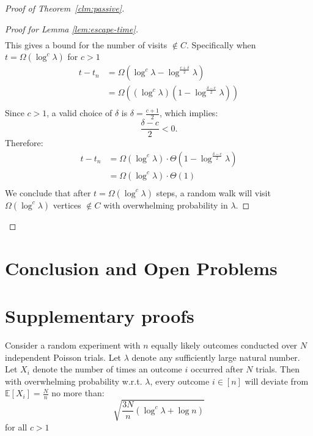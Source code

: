 \begin{proof} [Proof of Theorem~\ref{clm:passive}]
\begin{proof}[Proof for Lemma \ref{lem:escape-time}]
\begin{align*}
\end{align*}
This gives a bound for the number of visits $\not\in C$. Specifically when $t = \Omega(\log^c \lambda)$ for $c > 1$
\begin{align*}
    t - t_n &= \Omega(\log^c \lambda - \log^{\frac{c + \delta}{2}}\lambda)\\
    &= \Omega((\log^c \lambda)(1 - \log^{\frac{\delta - c}{2}}\lambda))\\
\end{align*}
Since $c > 1$, a valid choice of $\delta$ is $\delta = \frac{c + 1}{2}$, which implies:
$$
\frac{\delta - c}{2} < 0.
$$
Therefore:
\begin{align*}
    t - t_n &= \Omega(\log^c \lambda) \cdot \Theta(1 - \log^{\frac{\delta - c}{2}}\lambda)\\
    &= \Omega(\log^c \lambda) \cdot \Theta(1)\\
\end{align*}
We conclude that after $t = \Omega(\log^c \lambda)$ steps, a random walk will visit $\Omega(\log^c \lambda)$ vertices $\not\in C$ with overwhelming probability in $\lambda$.
\end{proof}

    
\end{proof}


\section{Conclusion and Open Problems}


\clearpage
%
%

 

\appendix 

\clearpage

\section{Supplementary proofs} \label{sec:proofs}

\begin{lemma} \label{lem:chernoff-deviation} Consider a random experiment with $n$ equally likely outcomes conducted over $N$ independent Poisson trials. Let $\lambda$ denote any sufficiently large natural number. Let $X_i$ denote the number of times an outcome $i$ occurred after $N$ trials. Then with overwhelming probability w.r.t. $\lambda$, every outcome $i \in [n]$ will deviate from $\mathbb{E}[X_i] = \frac{N}{n}$ no more than:
$$
\sqrt{\frac{3N}{n}(\log^c \lambda + \log n)}
$$
for all $c > 1$
\end{lemma} 

